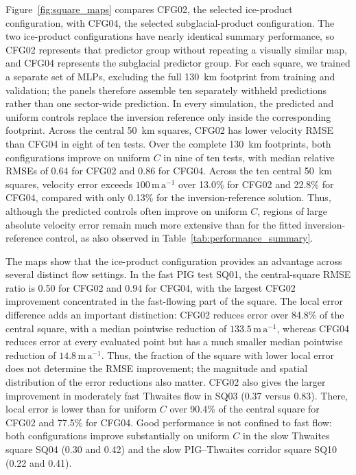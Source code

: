 \documentclass[review,jog]{igs}
\begin{document}
Figure~\ref{fig:square_maps} compares CFG02, the selected ice-product configuration, with CFG04, the selected subglacial-product configuration. The two ice-product configurations have nearly identical summary performance, so CFG02 represents that predictor group without repeating a visually similar map, and CFG04 represents the subglacial predictor group. For each square, we trained a separate set of MLPs, excluding the full 130~km footprint from training and validation; the panels therefore assemble ten separately withheld predictions rather than one sector-wide prediction. In every simulation, the predicted and uniform controls replace the inversion reference only inside the corresponding footprint. Across the central 50~km squares, CFG02 has lower velocity RMSE than CFG04 in eight of ten tests. Over the complete 130~km footprints, both configurations improve on uniform $C$ in nine of ten tests, with median relative RMSEs of 0.64 for CFG02 and 0.86 for CFG04. Across the ten central 50~km squares, velocity error exceeds $100\,\mathrm{m\,a^{-1}}$ over 13.0\% for CFG02 and 22.8\% for CFG04, compared with only 0.13\% for the inversion-reference solution. Thus, although the predicted controls often improve on uniform $C$, regions of large absolute velocity error remain much more extensive than for the fitted inversion-reference control, as also observed in Table~\ref{tab:performance_summary}.  %

The maps show that the ice-product configuration provides an advantage across several distinct flow settings. In the fast PIG test SQ01, the
central-square RMSE ratio is 0.50 for CFG02 and 0.94 for CFG04, with the
largest CFG02 improvement concentrated in the fast-flowing part of the
square. The local error difference adds an important distinction: CFG02
reduces error over 84.8\% of the central square, with a median pointwise
reduction of $133.5\,\mathrm{m\,a^{-1}}$, whereas CFG04 reduces error at
every evaluated point but has a much smaller median pointwise reduction of
$14.8\,\mathrm{m\,a^{-1}}$. Thus, the fraction of the square with lower local error does not determine the RMSE improvement; the magnitude and spatial distribution of the error reductions also matter. CFG02 also gives the larger improvement in moderately fast Thwaites flow in SQ03 (0.37 versus 0.83). There, local error is lower than for uniform $C$ over 90.4\% of the central square for CFG02 and 77.5\% for CFG04. Good performance is not confined to fast flow:
both configurations improve substantially on uniform $C$ in the slow
Thwaites square SQ04 (0.30 and 0.42) and the slow PIG--Thwaites corridor
square SQ10 (0.22 and 0.41).
\end{document}
